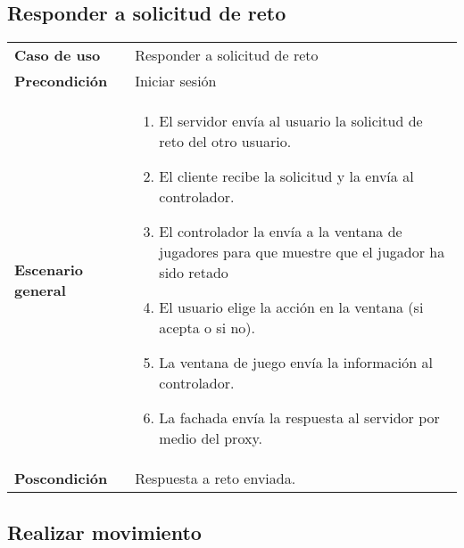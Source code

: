 \subsection{Responder a solicitud de reto}

{\footnotesize
\begin{tabularx}{0.95\textwidth}{p{}|X}

\textbf{Caso de uso} & Responder a solicitud de reto \\

\textbf{Precondición} & Iniciar sesión\\

\textbf{Escenario general} & \begin{enumerate}
\item El servidor envía al usuario la solicitud de reto del otro usuario.
\item El cliente recibe la solicitud y la envía al controlador.
\item El controlador la envía a la ventana de jugadores para que muestre que el jugador ha sido retado
\item El usuario elige la acción en la ventana (si acepta o si no).
\item La ventana de juego envía la información al controlador.
\item La fachada envía la respuesta al servidor por medio del proxy.
\end{enumerate} \\

\textbf{Poscondición} & Respuesta a reto enviada.

\end{tabularx}
}

\subsection{Realizar movimiento}

